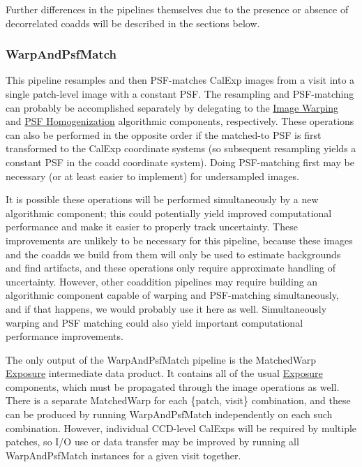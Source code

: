 Further differences in the pipelines themselves due to the presence or absence of decorrelated coadds will be described in the sections below.

\subsubsection{WarpAndPsfMatch}
\label{sec:drpWarpAndPsfMatch}

This pipeline resamples and then PSF-matches CalExp images from a visit into a single patch-level image with a constant PSF.  The resampling and PSF-matching can probably be accomplished separately by delegating to the \hyperref[sec:acWarping]{Image Warping} and \hyperref[sec:acPSFHomogenization]{PSF Homogenization} algorithmic components, respectively.  These operations can also be performed in the opposite order if the matched-to PSF is first transformed to the CalExp coordinate systems (so subsequent resampling yields a constant PSF in the coadd coordinate system).  Doing PSF-matching first may be necessary (or at least easier to implement) for undersampled images.

It is possible these operations will be performed simultaneously by a new algorithmic component; this could potentially yield improved computational performance and make it easier to properly track uncertainty.  These improvements are unlikely to be necessary for this pipeline, because these images and the coadds we build from them will only be used to estimate backgrounds and find artifacts, and these operations only require approximate handling of uncertainty.  However, other coaddition pipelines may require building an algorithmic component capable of warping and PSF-matching simultaneously, and if that happens, we would probably use it here as well.  Simultaneously warping and PSF matching could also yield important computational performance improvements.

The only output of the WarpAndPsfMatch pipeline is the MatchedWarp \hyperref[sec:spImagesExposure]{Exposure} intermediate data product.  It contains all of the usual \hyperref[sec:spImagesExposure]{Exposure} components, which must be propagated through the image operations as well.  There is a separate MatchedWarp for each \{patch, visit\} combination, and these can be produced by running WarpAndPsfMatch independently on each such combination.  However, individual CCD-level CalExps will be required by multiple patches, so I/O use or data transfer may be improved by running all WarpAndPsfMatch instances for a given visit together.

